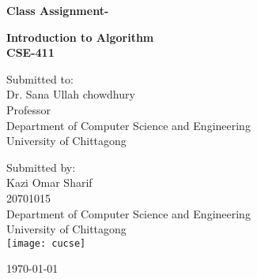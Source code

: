 \documentclass[12 pt]{article}
\begin{document}
\begin{center}
\begin{huge}
\textbf{{Class Assignment- }} \vspace*{.2 cm} \\
\end{huge}
\begin{large}
\textbf{Introduction to Algorithm} \\ \vspace{.2 cm}
\textbf{CSE-411}
\end{large}
\par 
Submitted to: \\
Dr. Sana Ullah chowdhury \\
 Professor \\
Department of Computer Science and Engineering \\
University of Chittagong \par
\vspace{2 cm} 

Submitted by: \\
Kazi Omar Sharif \\
20701015 \\
Department of Computer Science and Engineering \\
University of Chittagong \\

\vspace*{1 cm}
\texttt{[image: cucse]}

\vspace{.8 cm}

\today














\end{center}
\end{document}
